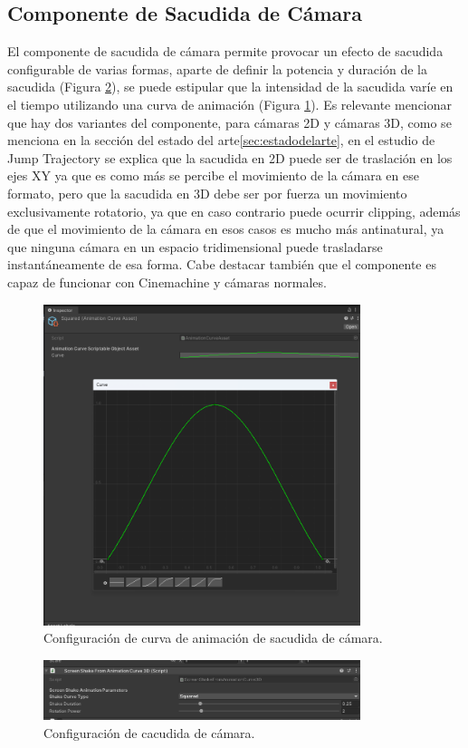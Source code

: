 \subsection{Componente de Sacudida de Cámara}
El componente de sacudida de cámara permite provocar un efecto de sacudida configurable de varias formas, aparte de definir la potencia y duración de la sacudida (Figura \ref{fig:screenshake2}), se puede 
estipular que la intensidad de la sacudida varíe en el tiempo utilizando una curva de animación (Figura \ref{fig:screenshake1}). Es relevante mencionar que hay dos variantes del componente, para cámaras 2D y 
cámaras 3D, como se menciona en la sección del estado del arte\ref{sec:estadodelarte}, en el estudio de Jump Trajectory\cite{Screenshake} se explica que la sacudida en 2D puede 
ser de traslación en los ejes XY ya que es como más se percibe el movimiento de la cámara en ese formato, pero que la sacudida en 3D debe ser por fuerza un movimiento 
exclusivamente rotatorio, ya que en caso contrario puede ocurrir clipping, además de que el movimiento de la cámara en esos casos es mucho más antinatural, ya que ninguna cámara
 en un espacio tridimensional puede trasladarse instantáneamente de esa forma. Cabe destacar también que el componente es capaz de funcionar con Cinemachine y cámaras normales. 

 
 \begin{figure}[H]
    \centering
    \includegraphics[width=350px,clip=true]{screenshakecurve.png}
    \caption{Configuración de curva de animación de sacudida de cámara.}
    \label{fig:screenshake1}
\end{figure}

\begin{figure}[H]
  \centering
    \includegraphics[width=350px,clip=true]{screenshake2.png}
  \caption{Configuración de cacudida de cámara.}
  \label{fig:screenshake2}
\end{figure}


